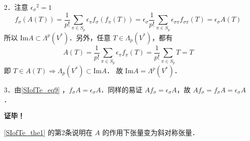 2．注意 ${\epsilon_\sigma}^2=1$
\begin{equation}\label{SIofTe_eq9}
f_\sigma(A(T))=\frac{1}{p!}\sum_{\pi\in S_p}\epsilon_\pi f_\sigma(f_\pi(T))=\epsilon_\sigma\frac{1}{p!}\sum_{\pi\in S_p}\epsilon_{\sigma\pi} f_{\sigma\pi}(T)=\epsilon_\sigma A(T)
\end{equation}
 所以 $\mathrm{Im} A\subset\Lambda^p(V^*)$．另外，任意 $T\in\Lambda_p(V^*)$，都有
 \begin{equation}
 A(T)=\frac{1}{p!}\sum_{\pi\in S_p}\epsilon_\pi f_\pi(T)=\frac{1}{p!}\sum_{\pi\in S_p}T=T
 \end{equation}
 即 $T\in A(T)\Rightarrow\Lambda_p(V^*)\subset\mathrm{Im} A$．
 故 $\mathrm{Im} A=\Lambda^p(V^*)$．

3．由\autoref{SIofTe_eq9} ，$f_\sigma A=\epsilon_\sigma A$．同样的易证 $Af_\sigma=\epsilon_\sigma A$，故 $Af_\sigma=f_\sigma A=\epsilon_\sigma A$．

\textbf{证毕！}

\autoref{SIofTe_the1} 的第2条说明在 $A$ 的作用下张量变为斜对称张量．